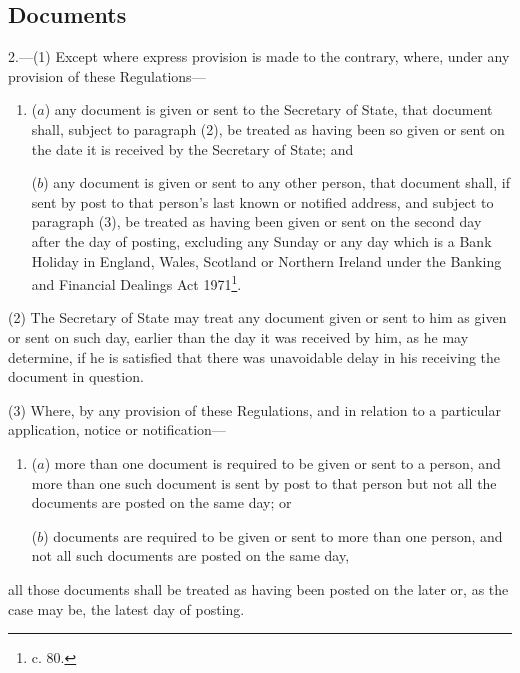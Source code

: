 \documentclass[12pt,a4paper]{article}
\begin{document}

\subsection[2. Documents]{Documents}

2.—(1) Except where express provision is made to the contrary, where,
under any provision of these Regulations—
\begin{enumerate}\item[]
($a$) any document is given or sent to the Secretary of State, that document shall,
subject to paragraph (2), be treated as having been so given or sent on the date
it is received by the Secretary of State; and

($b$) any document is given or sent to any other person, that document shall, if
sent by post to that person’s last known or notified address, and subject to
paragraph (3), be treated as having been given or sent on the second day after
the day of posting, excluding any Sunday or any day which is a Bank Holiday in
England, Wales, Scotland or Northern Ireland under the Banking and Financial
Dealings Act 1971\footnote{ c. 80.}.
\end{enumerate}

(2) The Secretary of State may treat any document given or sent to him as given
or sent on such day, earlier than the day it was received by him, as he may
determine, if he is satisfied that there was unavoidable delay in his receiving
the document in question.

(3) Where, by any provision of these Regulations, and in relation to a
particular application, notice or notification—
\begin{enumerate}\item[]
($a$) more than one document is required to be given or sent to a person, and more
than one such document is sent by post to that person but not all the documents
are posted on the same day; or

($b$) documents are required to be given or sent to more than one person, and not
all such documents are posted on the same day,
\end{enumerate}
all those documents shall be treated as having been posted on the later or, as
the case may be, the latest day of posting.
\end{document}
